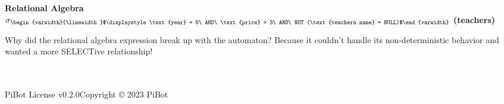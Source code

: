 \documentclass{article}
\date{}
\newcommand{\multiline}[1]{\begin{varwidth}{\linewidth}$\displaystyle #1$\end{varwidth}}
\begin{document}
\begin{landscape}
\pagestyle{fancy}
\fancyhf{}
\renewcommand{\headrulewidth}{0pt}
\begin{flushleft}
\doublespacing
{\fontsize{14}{12}\selectfont
\textbf{\huge{Relational Algebra}}\newline \\
\fontsize{14}{12}\selectfont$\sigma_{\fontsize{10}{5}\multiline{\text{year} = 5\ AND\ \text{price} > 3\ AND\ NOT (\text{teachers.name} = NULL)}}$
\textbf{(teachers)}
}
\end{flushleft}
\vfill
Why did the relational algebra expression break up with the automaton? Because it couldn't handle its non-deterministic behavior and wanted a more SELECTive relationship!
\\ \\ \\ 
\begin{center}
\parbox{\linewidth}{\raggedright PiBot License v0.2.0\hfill Copyright © 2023 PiBot}
\end{center}
\end{landscape}
\end{document}
